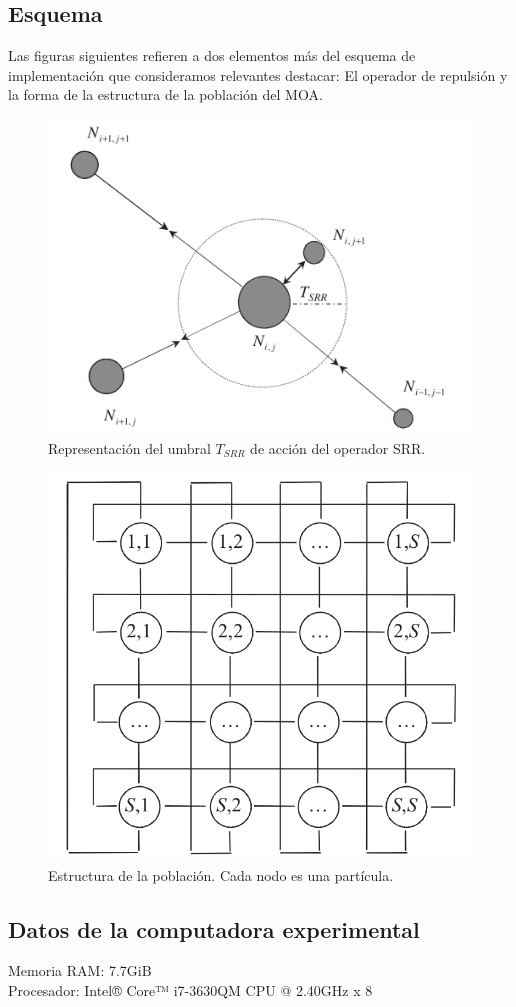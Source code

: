 \documentclass[12pt]{article}
\begin{document}
\subsection*{Esquema}
Las figuras siguientes refieren a dos elementos más del esquema de
implementación que consideramos relevantes destacar: El operador de repulsión y la forma de la estructura de la población del MOA.
\begin{multicols}{2}
\begin{figure}[H]
  \centering
  \includegraphics[width=.5\textwidth]{SRR}
  \caption{Representación del umbral $T_{SRR}$ de acción del operador SRR.}
\end{figure}
\begin{figure}[H]
  \centering
  \includegraphics[width=.437\textwidth]{cell}
  \caption{Estructura de la población. Cada nodo es una partícula.}
\end{figure}
\end{multicols}

\subsection*{Datos de la computadora experimental}
\noindent Memoria RAM: 7.7GiB \\
Procesador: Intel® Core™ i7-3630QM CPU @ 2.40GHz x 8 
\end{document}
